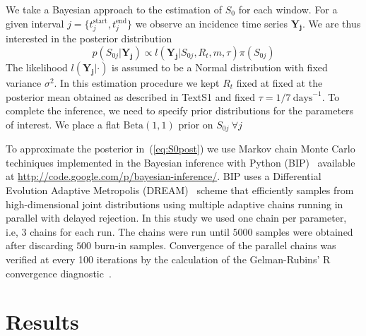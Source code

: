 We take a Bayesian approach to the estimation of $S_0$ for each window.
For a given interval $j = \{ t_j^{\text{start}}, t_j^{\text{end}} \} $ we 
observe an incidence time series $\mathbf{Y_{j}}$.
We are thus interested in the posterior distribution
\begin{equation}
 \label{eq:S0post}
 p(S_{0j}|\mathbf{Y_{j}}) \propto l(\mathbf{Y_{j}}|S_{0j}, R_t, m,  \tau 
)\pi(S_{0j}) 
\end{equation}
The likelihood $l(\mathbf{Y_{j}}|\cdot)$ is assumed to be a Normal distribution 
with fixed variance $\sigma^2$.
In this estimation procedure we kept $R_t$ fixed at fixed at the posterior mean 
obtained as described in TextS1 and fixed $\tau = 1/7\: \text{days}^{-1}$.
To complete the inference, we need to specify prior distributions for the 
parameters of interest.
We place a flat $\text{Beta}(1, 1)$ prior on $S_{0j}\:\forall j$
% 



To approximate the posterior in~(\ref{eq:S0post}) we use Markov chain Monte 
Carlo techiniques implemented in the Bayesian inference with Python 
(BIP)~\cite{pone2011} available at 
\url{http://code.google.com/p/bayesian-inference/}.
BIP uses a Differential Evolution Adaptive Metropolis (DREAM)~\cite{vrugt2008} 
scheme that efficiently samples from high-dimensional joint distributions using 
multiple adaptive chains running in parallel with delayed rejection.
In this study we used one chain per parameter, i.e, 3 chains for each run.
The chains were run until $5000$ samples were obtained after discarding $500$ 
burn-in samples.
Convergence of the parallel chains was verified at every 100 iterations by the 
calculation of the Gelman-Rubins' R convergence diagnostic~\cite{brooks1998}.

\section*{Results}
